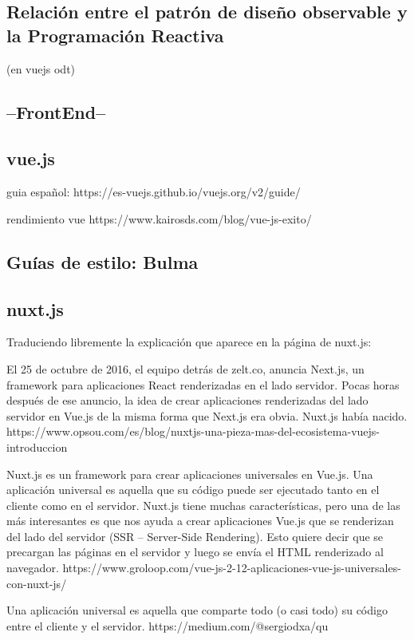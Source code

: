 \subsection{Relación entre el patrón de diseño observable y la Programación Reactiva}
(en vuejs odt)
\subsection{--FrontEnd--}
\subsection{vue.js}
guia español: https://es-vuejs.github.io/vuejs.org/v2/guide/

rendimiento vue
https://www.kairosds.com/blog/vue-js-exito/

\subsection{Guías de estilo: Bulma}
\subsection{nuxt.js}

Traduciendo libremente la explicación que aparece en la página de nuxt.js:

    El 25 de octubre de 2016, el equipo detrás de zelt.co, anuncia Next.js, un framework para aplicaciones React renderizadas en el lado servidor. Pocas horas después de ese anuncio, la idea de crear aplicaciones renderizadas del lado servidor en Vue.js de la misma forma que Next.js era obvia. Nuxt.js había nacido.
https://www.opsou.com/es/blog/nuxtjs-una-pieza-mas-del-ecosistema-vuejs-introduccion


Nuxt.js es un framework para crear aplicaciones universales en Vue.js. Una aplicación universal es aquella que su código puede ser ejecutado tanto en el cliente como en el servidor. Nuxt.js tiene muchas características, pero una de las más interesantes es que nos ayuda a crear aplicaciones Vue.js que se renderizan del lado del servidor (SSR – Server-Side Rendering). Esto quiere decir que se precargan las páginas en el servidor y luego se envía el HTML renderizado al navegador.
https://www.groloop.com/vue-js-2-12-aplicaciones-vue-js-universales-con-nuxt-js/

Una aplicación universal es aquella que comparte todo (o casi todo) su código entre el cliente y el servidor.
https://medium.com/@sergiodxa/qu%

